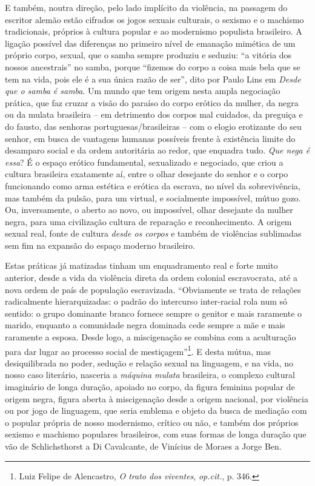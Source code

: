 E também, noutra direção, pelo lado implícito da violência, na passagem
do escritor alemão estão cifrados os jogos sexuais culturais, o sexismo
e o machismo tradicionais, próprios à cultura popular e ao modernismo
populista brasileiro. A ligação possível das diferenças no primeiro
nível de emanação mimética de um próprio corpo, sexual, que o samba
sempre produziu e seduziu: ``a vitória dos nossos ancestrais'' no samba,
porque ``fizemos do corpo a coisa mais bela que se tem na vida, pois ele
é a sua única razão de ser'', dito por Paulo Lins em \emph{Desde que o
samba é samba}. Um mundo que tem origem nesta ampla negociação prática,
que faz cruzar a visão do paraíso do corpo erótico da mulher, da negra
ou da mulata brasileira -- em detrimento dos corpos mal cuidados, da
preguiça e do fausto, das senhoras portuguesas/brasileiras -- com o
elogio erotizante do seu senhor, em busca de vantagens humanas possíveis
frente à existência limite do desamparo social e da ordem autoritária ao
redor, que enquadra tudo. \emph{Que nega é essa}? É o espaço erótico
fundamental, sexualizado e negociado, que criou a cultura brasileira
exatamente aí, entre o olhar desejante do senhor e o corpo funcionando
como arma estética e erótica da escrava, no nível da sobrevivência, mas
também da pulsão, para um virtual, e socialmente impossível, mútuo gozo.
Ou, inversamente, o aberto ao novo, ou impossível, olhar desejante da
mulher negra, para uma civilização cultura de reparação e
reconhecimento. A origem sexual real, fonte de cultura \emph{desde os
corpos} e também de violências sublimadas sem fim na expansão do espaço
moderno brasileiro.

Estas práticas já matizadas tinham um enquadramento real e forte muito
anterior, desde a vida da violência direta da ordem colonial
escravocrata, até a nova ordem de país de população escravizada.
``Obviamente se trata de relações radicalmente hierarquizadas: o padrão
do intercurso inter-racial rola num só sentido: o grupo dominante branco
fornece sempre o genitor e mais raramente o marido, enquanto a
comunidade negra dominada cede sempre a mãe e mais raramente a esposa.
Desde logo, a miscigenação se combina com a aculturação para dar lugar
ao processo social de mestiçagem''\footnote{Luiz Felipe de Alencastro,
  \emph{O trato dos viventes}, \emph{op.cit.}, p. 346.}. E desta mútua,
mas desiquilibrada no poder, sedução e relação sexual na linguagem, e na
vida, no nosso caso literário, nasceria a \emph{máquina mulata}
brasileira, o complexo cultural imaginário de longa duração, apoiado no
corpo, da figura feminina popular de origem negra, figura aberta à
miscigenação desde a origem nacional, por violência ou por jogo de
linguagem, que seria emblema e objeto da busca de mediação com o popular
própria de nosso modernismo, crítico ou não, e também dos próprios
sexismo e machismo populares brasileiros, com suas formas de longa
duração que vão de Schlichsthorst a Di Cavalcante, de Vinícius de Moraes
a Jorge Ben.

